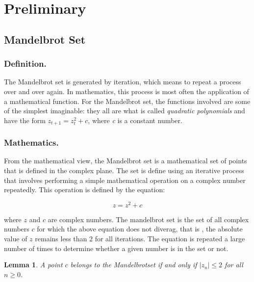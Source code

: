 \documentclass{article}
\newtheorem{lemma}{Lemma}[section]
\begin{document}
        
\section{Preliminary}
    \subsection{Mandelbrot Set}
        \subsubsection{Definition. } The Mandelbrot set is generated by iteration, which means to repeat a process over and over again. In mathematics, this process is most often the application of a mathematical function. For the Mandelbrot set, the functions involved are some of the simplest imaginable: they all are what is called \textit{quadratic polynomials} and have the form $z_{t+1}=z_t^2+c$, where \textit{c} is a constant number.

        \subsubsection{Mathematics. } From the mathematical view, the Mandelbrot set is a mathematical set of points that is defined in the complex plane. The set is define using an iterative process that involves performing a simple mathematical operation on a complex number repeatedly. This operation is defined by the equation:

        \begin{equation}
            \label{equ:iter}
            z=z^2+c
        \end{equation}

        where $z$ and $c$ are complex numbers. The mandelbrot set is the set of all complex numbers $c$ for which the above equation does not diverag, that is , the absolute value of $z$ remains less than $2$ for all iterations. The equation is repeated a large number of times to determine whether a given number is in the set or not.
        
        \begin{lemma}
	   A point $c$ belongs to the Mandelbrotset if and only if $|z_n| \leq 2$ for all $n \geq 0$.
        \end{lemma}
        
\end{document}
